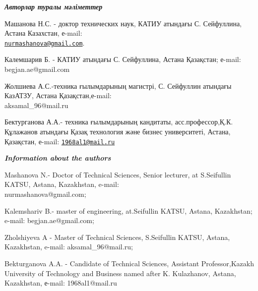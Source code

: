 \begin{authorinfo}
\emph{{\bfseries Авторлар туралы мәліметтер}}

Машанова Н.С. - доктор технических наук, КАТИУ атындағы С.
Сейфуллина, Астана Казахстан, е-mail:\\
\href{mailto:nurmashanova@gmail.com}{\nolinkurl{nurmashanova@gmail.com}}.

Калемшарив Б. - КАТИУ атындағы С. Сейфуллина, Астана Қазақстан; е-mail:
begjan.ae@gmail.com

Жолшиева А.С.-техника ғылымдарының магистрі, С. Сейфуллин атындағы
КазАТЗУ, Астана Қазақстан,е-mail: \\aksamal\_96@mail.ru

Бектурганова А.А.- техника ғылымдарының кандитаты, асс.профессор,Қ.К.
Құлажанов атындағы Қазақ технология және бизнес университеті, Астана,
Қазақстан, е-mail:
\href{mailto:1968al1@mail.ru}{\nolinkurl{1968al1@mail.ru}}

\emph{{\bfseries Information about the authors}}

Mashanova N.- Doctor of Technical Sciences, Senior lecturer, at
S.Seifullin KATSU, Astana, Kazakhstan, e-mail: \\nurmashanova@gmail.com;

Kalemshariv B.- master of engineering, at.Seifullin KATSU, Astana,
Kazakhstan; e-mail: begjan.ae@gmail.com;

Zholshiyeva A - Master of Technical Sciences, S.Seifullin KATSU, Astana,
Kazakhstan, e-mail: aksamal\_96@mail.ru;

Bekturganova A.A. - Candidate of Technical Sciences, Assistant
Professor,Kazakh University of Technology and Business named after K.
Kulazhanov, Astana, Kazakhstan, е-mail: 1968al1@mail.ru
\end{authorinfo}

